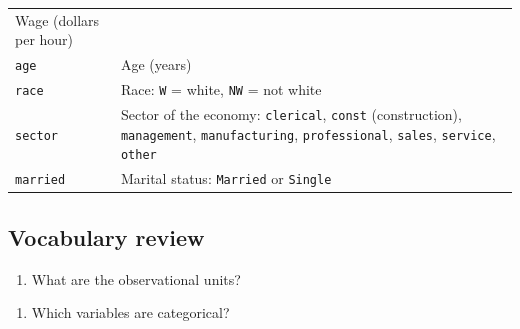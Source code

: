 \documentclass[
]{report}
\providecommand{\tightlist}{%
  \setlength{\itemsep}{0pt}\setlength{\parskip}{0pt}}
\begin{document}
\begin{longtable}[]{@{}ll@{}}
\begin{minipage}[t]{0.83\columnwidth}
Wage (dollars per hour) \textbar{}\strut
\end{minipage}\tabularnewline
\begin{minipage}[t]{0.11\columnwidth}\raggedright
\texttt{age}\strut
\end{minipage} & \begin{minipage}[t]{0.83\columnwidth}\raggedright
Age (years)\strut
\end{minipage}\tabularnewline
\begin{minipage}[t]{0.11\columnwidth}\raggedright
\texttt{race}\strut
\end{minipage} & \begin{minipage}[t]{0.83\columnwidth}\raggedright
Race: \texttt{W} = white, \texttt{NW} = not white \textbar{}\strut
\end{minipage}\tabularnewline
\begin{minipage}[t]{0.11\columnwidth}\raggedright
\texttt{sector}\strut
\end{minipage} & \begin{minipage}[t]{0.83\columnwidth}\raggedright
Sector of the economy: \texttt{clerical}, \texttt{const} (construction), \texttt{management}, \texttt{manufacturing}, \texttt{professional}, \texttt{sales}, \texttt{service}, \texttt{other}\strut
\end{minipage}\tabularnewline
\begin{minipage}[t]{0.11\columnwidth}\raggedright
\texttt{married}\strut
\end{minipage} & \begin{minipage}[t]{0.83\columnwidth}\raggedright
Marital status: \texttt{Married} or \texttt{Single}\strut
\end{minipage}\tabularnewline
\bottomrule
\end{longtable}

\hypertarget{vocabulary-review}{%
\subsection*{Vocabulary review}\label{vocabulary-review}}

\begin{enumerate}
\def\labelenumi{\arabic{enumi}.}
\tightlist
\item
  What are the observational units?
\end{enumerate}

\vspace{0.2in}

\begin{enumerate}
\def\labelenumi{\arabic{enumi}.}
\setcounter{enumi}{1}
\tightlist
\item
  Which variables are categorical?
\end{enumerate}
\end{document}
